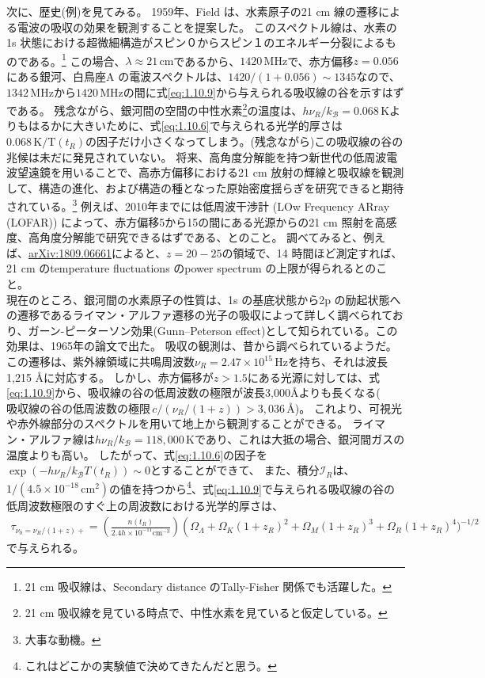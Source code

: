 \documentclass[11pt]{ltjsarticle}
\theoremstyle{plain}
\theoremstyle{break}
\begin{document}
次に、歴史(例)を見てみる。
1959年、Field は、水素原子の21 cm 線の遷移による電波の吸収の効果を観測することを提案した。
このスペクトル線は、水素の1s 状態における超微細構造がスピン０からスピン１のエネルギー分裂によるものである。\footnote{21 cm 吸収線は、Secondary distance のTally-Fisher 関係でも活躍した。}
この場合、$\lambda \approx 21 \,\mathrm{cm}$であるから、$1420 \, \mathrm{MHz}$で、赤方偏移$z=0.056$にある銀河、白鳥座A の電波スペクトルは、$1420/(1+0.056) \sim 1345$なので、$1342\,\mathrm{MHz}$から$1420 \, \mathrm{MHz}$の間に式\eqref{eq:1.10.9}から与えられる吸収線の谷を示すはずである。
残念ながら、銀河間の空間の中性水素\footnote{21 cm 吸収線を見ている時点で、中性水素を見ていると仮定している。}の温度は、$h \nu_{R} / k_{\mathcal{B}}=0.068\, \mathrm{K}$よりもはるかに大きいために、式\eqref{eq:1.10.6}で与えられる光学的厚さは$0.068 \, \mathrm{K} / \mathrm{T}\left(t_{R}\right)$の因子だけ小さくなってしまう。(残念ながら)この吸収線の谷の兆候は未だに発見されていない。
将来、高角度分解能を持つ新世代の低周波電波望遠鏡を用いることで、高赤方偏移における21 cm 放射の輝線と吸収線を観測して、構造の進化、および構造の種となった原始密度揺らぎを研究できると期待されている。\footnote{大事な動機。}
例えば、2010年までには低周波干渉計
(LOw Frequency ARray (LOFAR)) によって、赤方偏移5から15の間にある光源からの21 cm 照射を高感度、高角度分解能で研究できるはずである、とのこと。
調べてみると、例えば、\href{https://arxiv.org/pdf/1809.06661.pdf}{arXiv:1809.06661}によると、$z = 20-25$の領域で、14 時間ほど測定すれば、21 cm のtemperature fluctuations のpower spectrum の上限が得られるとのこと。\\

現在のところ、銀河間の水素原子の性質は、1s の基底状態から2p の励起状態への遷移であるライマン・アルファ遷移の光子の吸収によって詳しく調べられており、ガーン-ピーターソン効果(Gunn–Peterson effect)として知られている。この効果は、1965年の論文で出た。
吸収の観測は、昔から調べられているようだ。
この遷移は、紫外線領域に共鳴周波数$\nu_{R} = 2.47 \times 10^{15} \, \mathrm{Hz}$を持ち、それは波長1,215 {\AA}に対応する。
しかし、赤方偏移が$z>1.5$にある光源に対しては、式\eqref{eq:1.10.9}から、吸収線の谷の低周波数の極限が波長3,000{\AA}よりも長くなる($吸収線の谷の低周波数の極限\,c/(\nu_{R}/(1+z)) > 3,036 \,\text{{\AA}}$)。
これより、可視光や赤外線部分のスペクトルを用いて地上から観測することができる。
ライマン・アルファ線は$h \nu_{R} / k_{\mathcal{B}}=118,000\, \mathrm{K}$であり、これは大抵の場合、銀河間ガスの温度よりも高い。
したがって、式\eqref{eq:1.10.6}の因子を$\exp \left(-h \nu_{R} / k_{\mathcal{B}} T\left(t_{R}\right)\right) \sim 0$とすることができて、
また、積分$\mathcal{I}_{R}$は、$1/(4.5 \times 10^{-18} \, \mathrm{cm^2})$の値を持つから\footnote{これはどこかの実験値で決めてきたんだと思う。}、式\eqref{eq:1.10.9}で与えられる吸収線の谷の低周波数極限のすぐ上の周波数における光学的厚さは、
\begin{align}
  \tau_{\nu_{0}=\nu_{R} /(1+z)+}=\left(\frac{n\left(t_{R}\right)}{2.4 h \times 10^{-11} \mathrm{cm}^{-3}}\right)\left(\Omega_{\Lambda}+\Omega_{K}(1+z_R)^{2}\right.+\Omega_{M}(1+z_R)^{3}+\Omega_{R}(1+z_R)^{4} )^{-1 / 2}  \label{eq:1.10.10}
\end{align}%
で与えられる。
\end{document}

